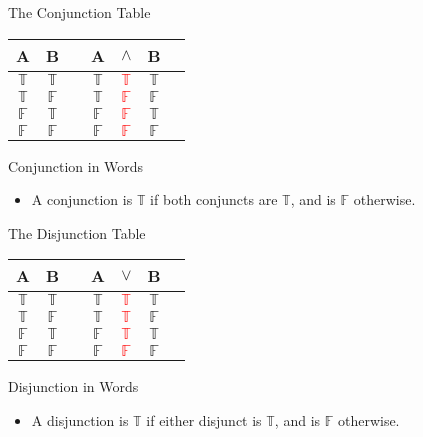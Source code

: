 \documentclass[
  ignorenonframetext,
]{beamer}
\providecommand{\tightlist}{%
  \setlength{\itemsep}{0pt}\setlength{\parskip}{0pt}}
\renewcommand{\,}{\text{, }}
\def\True{\mathbb{T}}
\def\False{\mathbb{F}}
\begin{document}
\begin{frame}{The Conjunction Table}
\protect\hypertarget{the-conjunction-table}{}
\begin{center}
\begin{tabular}{@{ }c@{ }@{ }c | c@{ }@{ }c@{ }@{ }c@{ }@{ }c@{ }@{ }c}
A & B &  & A & $\wedge$ & B & \\
\hline 
$\True$ & $\True$ &  & $\True$ & \textcolor{red}{$\True$} & $\True$ & \\
$\True$ & $\False$ &  & $\True$ & \textcolor{red}{$\False$} & $\False$ & \\
$\False$ & $\True$ &  & $\False$ & \textcolor{red}{$\False$} & $\True$ & \\
$\False$ & $\False$ &  & $\False$ & \textcolor{red}{$\False$} & $\False$ & \\
\end{tabular}
\end{center}
\end{frame}

\begin{frame}{Conjunction in Words}
\protect\hypertarget{conjunction-in-words}{}
\begin{itemize}
\tightlist
\item
  A conjunction is \(\True\) if both conjuncts are \(\True\), and is
  \(\False\) otherwise.
\end{itemize}
\end{frame}

\begin{frame}{The Disjunction Table}
\protect\hypertarget{the-disjunction-table}{}
\begin{center}
\begin{tabular}{@{ }c@{ }@{ }c | c@{ }@{ }c@{ }@{ }c@{ }@{ }c@{ }@{ }c}
A & B &  & A & $\vee$ & B & \\
\hline 
$\True$ & $\True$ &  & $\True$ & \textcolor{red}{$\True$} & $\True$ & \\
$\True$ & $\False$ &  & $\True$ & \textcolor{red}{$\True$} & $\False$ & \\
$\False$ & $\True$ &  & $\False$ & \textcolor{red}{$\True$} & $\True$ & \\
$\False$ & $\False$ &  & $\False$ & \textcolor{red}{$\False$} & $\False$ & \\
\end{tabular}
\end{center}
\end{frame}

\begin{frame}{Disjunction in Words}
\protect\hypertarget{disjunction-in-words}{}
\begin{itemize}
\tightlist
\item
  A disjunction is \(\True\) if either disjunct is \(\True\), and is
  \(\False\) otherwise.
\end{itemize}
\end{frame}
\end{document}
